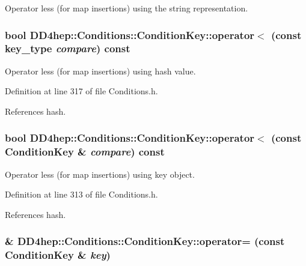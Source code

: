Operator less (for map insertions) using the string representation. \hypertarget{class_d_d4hep_1_1_conditions_1_1_condition_key_a5827486a4f51126bcc9f036dcafb7b57}{
\subsubsection[{operator$<$}]{\setlength{\rightskip}{0pt plus 5cm}bool DD4hep::Conditions::ConditionKey::operator$<$ (const {\bf key\_\-type} {\em compare}) const}}
\label{class_d_d4hep_1_1_conditions_1_1_condition_key_a5827486a4f51126bcc9f036dcafb7b57}


Operator less (for map insertions) using hash value. 

Definition at line 317 of file Conditions.h.

References hash.\hypertarget{class_d_d4hep_1_1_conditions_1_1_condition_key_a76862dc605eb22d136bb98c77e8de247}{
\subsubsection[{operator$<$}]{\setlength{\rightskip}{0pt plus 5cm}bool DD4hep::Conditions::ConditionKey::operator$<$ (const {\bf ConditionKey} \& {\em compare}) const}}
\label{class_d_d4hep_1_1_conditions_1_1_condition_key_a76862dc605eb22d136bb98c77e8de247}


Operator less (for map insertions) using key object. 

Definition at line 313 of file Conditions.h.

References hash.\hypertarget{class_d_d4hep_1_1_conditions_1_1_condition_key_a4b89b384d431b3699986aa21935ddd8b}{
\subsubsection[{operator=}]{ \& DD4hep::Conditions::ConditionKey::operator= (const {\bf ConditionKey} \& {\em key})}}
\label{class_d_d4hep_1_1_conditions_1_1_condition_key_a4b89b384d431b3699986aa21935ddd8b}


